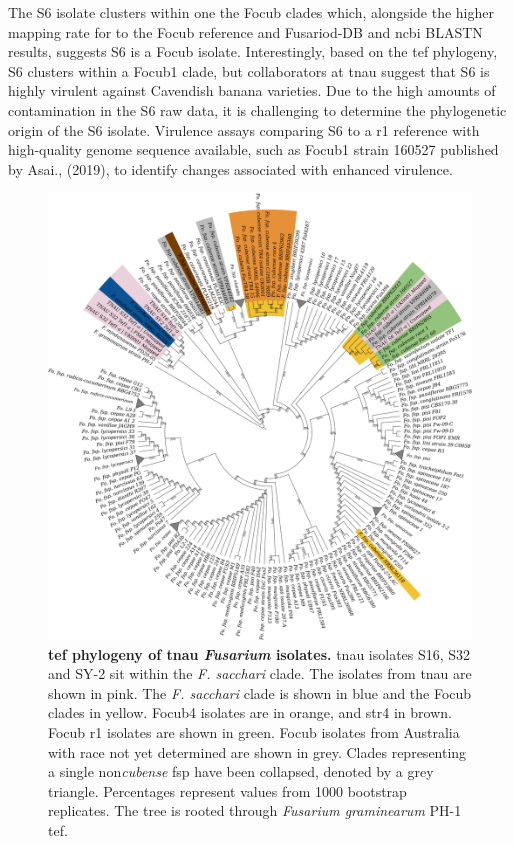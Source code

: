 The S6 isolate clusters within one the \ac{Focub} clades which, alongside the higher mapping rate for to the \ac{Focub} reference and Fusariod-DB and \ac{ncbi} BLASTN results, suggests S6 is a \ac{Focub} isolate. Interestingly, based on the \ac{tef} phylogeny, S6 clusters within a \ac{Focub1} clade, but collaborators at \ac{tnau} suggest that S6 is highly virulent against Cavendish banana varieties. Due to the high amounts of contamination in the S6 raw data, it is challenging to determine the phylogenetic origin of the S6 isolate. Virulence assays comparing S6 to a \ac{r1} reference with high-quality genome sequence available, such as \ac{Focub1} strain 160527 published by Asai., \et (2019), to identify changes associated with enhanced virulence.

\begin{figure}[h!]
    \centering
    \includegraphics[width=14cm]{Figures/TEF1aPhylo-Including_mindanoense.png}
    \caption[\Acl{tef} phylogeny of \acl{tnau} \textit{Fusarium} isolates.]{\textbf{\Acl{tef} phylogeny of \acl{tnau} \textit{Fusarium} isolates.} \Ac{tnau} isolates S16, S32 and SY-2 sit within the\textit{ F. sacchari} clade. The isolates from \ac{tnau} are shown in pink. The \textit{F. sacchari} clade is shown in blue and the \acl{Focub} clades in yellow. \Acl{Focub4} isolates are in orange, and \ac{str4} in brown. \Ac{Focub} \acl{r1} isolates are shown in green. \ac{Focub} isolates from Australia with race not yet determined are shown in grey. Clades representing a single non\-\textit{cubense} \ac{fsp} have been collapsed, denoted by a grey triangle.  Percentages represent values from 1000 bootstrap replicates. The tree is rooted through \textit{Fusarium graminearum} PH-1 \ac{tef}.}
    \label{fig:TEF1aPhylo}
\end{figure}

